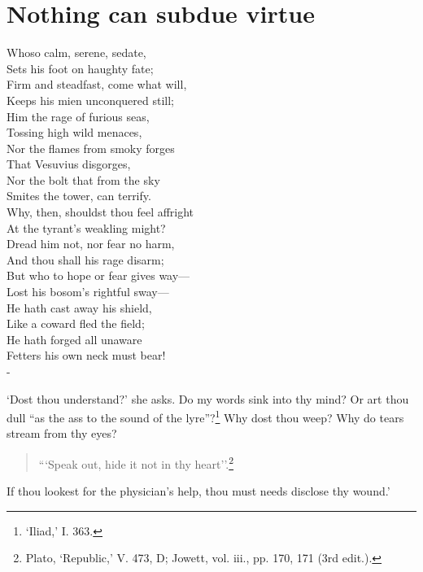 \documentclass[12pt]{book}
\newenvironment{ipoem}[1]%
  {\setcounter{poemindentevery}{#1}\begin{poem}\small}%
  {\end{poem}\setcounter{poemindentevery}{0}}
\begin{document}
\section{Nothing can subdue virtue}

\begin{ipoem}{0}
    Whoso calm, serene, sedate, \\
    Sets his foot on haughty fate; \\
    Firm and steadfast, come what will, \\
    Keeps his mien unconquered still; \\
    Him the rage of furious seas, \\
    Tossing high wild menaces, \\
    Nor the flames from smoky forges \\
    That Vesuvius disgorges, \\
    Nor the bolt that from the sky \\
    Smites the tower, can terrify. \\
    Why, then, shouldst thou feel affright \\
    At the tyrant's weakling might? \\
    Dread him not, nor fear no harm, \\
    And thou shall his rage disarm; \\
    But who to hope or fear gives way--- \\
    Lost his bosom's rightful sway--- \\
    He hath cast away his shield, \\
    Like a coward fled the field; \\
    He hath forged all unaware \\
    Fetters his own neck must bear! \\-
\end{ipoem}


`Dost thou understand?' she asks. Do my words sink into thy mind? Or art
thou dull ``as the ass to the sound of the lyre''?\footnote{‘Iliad,’ I. 363.} Why dost thou weep? Why
do tears stream from thy eyes?

\begin{quote}
  ```Speak out, hide it not in thy heart''.\footnote{Plato, ‘Republic,’ V. 473, D; Jowett, vol. iii., pp. 170, 171 (3rd edit.).}
\end{quote}

If thou lookest for the physician's help, thou must needs disclose thy
wound.'
\end{document}
